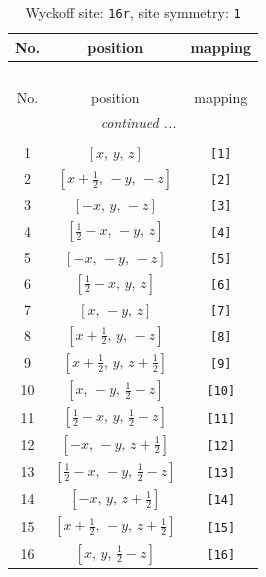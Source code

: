 \documentclass[fleqn,8pt]{jsarticle}
\begin{document}
\begin{longtable}{ccc}
\caption{Wyckoff site: {\tt 16r}, site symmetry: {\tt 1}}
 \\
 \hline \hline
No. & position & mapping \\ \hline \endfirsthead

\multicolumn{2}{l}{\tablename\ \thetable{}} \\
 \hline \hline
No. & position & mapping \\ \hline \endhead

 \hline \hline
\multicolumn{2}{r}{\footnotesize\it continued ...} \\ \endfoot

 \hline \hline
\multicolumn{2}{r}{} \\ \endlastfoot

1 & $\left[ x,\, y,\, z \right]$ & {\tt [1]} \\ \hline
2 & $\left[ x + \frac{1}{2},\, - y,\, - z \right]$ & {\tt [2]} \\ \hline
3 & $\left[ - x,\, y,\, - z \right]$ & {\tt [3]} \\ \hline
4 & $\left[ \frac{1}{2} - x,\, - y,\, z \right]$ & {\tt [4]} \\ \hline
5 & $\left[ - x,\, - y,\, - z \right]$ & {\tt [5]} \\ \hline
6 & $\left[ \frac{1}{2} - x,\, y,\, z \right]$ & {\tt [6]} \\ \hline
7 & $\left[ x,\, - y,\, z \right]$ & {\tt [7]} \\ \hline
8 & $\left[ x + \frac{1}{2},\, y,\, - z \right]$ & {\tt [8]} \\ \hline
9 & $\left[ x + \frac{1}{2},\, y,\, z + \frac{1}{2} \right]$ & {\tt [9]} \\ \hline
10 & $\left[ x,\, - y,\, \frac{1}{2} - z \right]$ & {\tt [10]} \\ \hline
11 & $\left[ \frac{1}{2} - x,\, y,\, \frac{1}{2} - z \right]$ & {\tt [11]} \\ \hline
12 & $\left[ - x,\, - y,\, z + \frac{1}{2} \right]$ & {\tt [12]} \\ \hline
13 & $\left[ \frac{1}{2} - x,\, - y,\, \frac{1}{2} - z \right]$ & {\tt [13]} \\ \hline
14 & $\left[ - x,\, y,\, z + \frac{1}{2} \right]$ & {\tt [14]} \\ \hline
15 & $\left[ x + \frac{1}{2},\, - y,\, z + \frac{1}{2} \right]$ & {\tt [15]} \\ \hline
16 & $\left[ x,\, y,\, \frac{1}{2} - z \right]$ & {\tt [16]} \\
\end{longtable}
\end{document}
